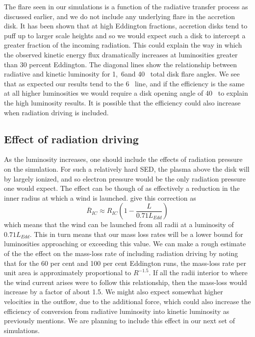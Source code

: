 \documentclass[a4paper,fleqn,usenatbib]{mnras}
\begin{document}
The flare seen in our simulations is a function of the radiative transfer process as discussed earlier, and we 
do not include any underlying flare in the accretion disk. It has been shown that at high Eddington fractions,
accretion disks tend to puff up to larger scale heights \citep[][but also see \citealt{2016A&A...587A..13L}]{1988ApJ...332..646A,2005MNRAS.357..295O} and so we would
expect such a disk to intercept a greater fraction of the incoming radiation. This could explain the way in which 
the observed kinetic energy flux dramatically increases at luminosities greater than 30 percent Eddington. The
diagonal lines show the relationship between radiative and kinetic luminosity for 1\degree,~6\degree and 40\degree~
total disk flare angles. We see that as expected our results tend to the 6\degree~ line, and if the efficiency is 
the same at all higher luminosities we would require a disk opening angle of 40\degree~ to explain the high 
luminosity results. It is possible that the efficiency could also increase when radiation driving is included.


\subsection{Effect of radiation driving}

As the luminosity increases, one should include the effects
of radiation pressure on the simulation. For such a relatively hard SED, 
the plasma above the disk will by largely ionized, and so electron
pressure would be the only radiation pressure one would expect. The 
effect can be though of as effectively a reduction in the inner radius
at which a wind is launched. \cite{2018MNRAS.473..838D} give this 
correction as
\begin{equation}
\overline{R}_{IC}\approx R_{IC}\left(1-\frac{L}{0.71L_{Edd}}\right)
\end{equation}
which means that the wind can be launched from all radii at a luminosity
of $0.71 L_{Edd}$. This in turn means that our mass loss rates will be a lower 
bound for luminosities approaching or exceeding this value. We can make a rough
estimate of the the effect on the mass-loss rate of including radiation driving by
noting that for the 60 per cent and 100 per cent Eddington runs, the mass-loss
rate per unit area is approximately proportional to $R^{-1.5}$. If all the radii
interior to where the wind current arises were to follow this relationship, then the 
mass-loss would increase by a factor of about 1.5. 
We might also 
expect somewhat higher velocities in the outflow, due to the additional force, which could also
increase the efficiency of conversion from radiative luminosity into kinetic luminosity as previously
mentions. 
We are planning to include this effect in our next set of simulations.
\end{document}

